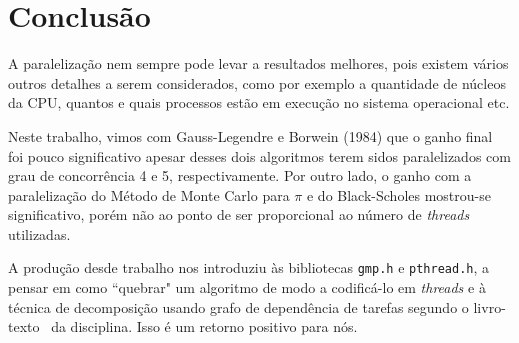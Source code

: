\section{Conclusão}

A paralelização nem sempre pode levar a resultados melhores, pois existem vários outros detalhes a serem considerados, como por exemplo a quantidade de núcleos da CPU, quantos e quais processos estão em execução no sistema operacional etc.

Neste trabalho, vimos com Gauss-Legendre e Borwein (1984) que o ganho final foi pouco significativo apesar desses dois algoritmos terem sidos paralelizados com grau de concorrência 4 e 5, respectivamente. Por outro lado, o ganho com a paralelização do Método de Monte Carlo para $\pi$ e do Black-Scholes mostrou-se significativo, porém não ao ponto de ser proporcional ao número de \emph{threads} utilizadas.

A produção desde trabalho nos introduziu às bibliotecas \texttt{gmp.h} e \texttt{pthread.h}, a pensar em como ``quebrar" um algoritmo de modo a codificá-lo em \textit{threads} e à técnica de decomposição usando grafo de dependência de tarefas segundo o livro-texto~\cite{livro} da disciplina. Isso é um retorno positivo para nós.
